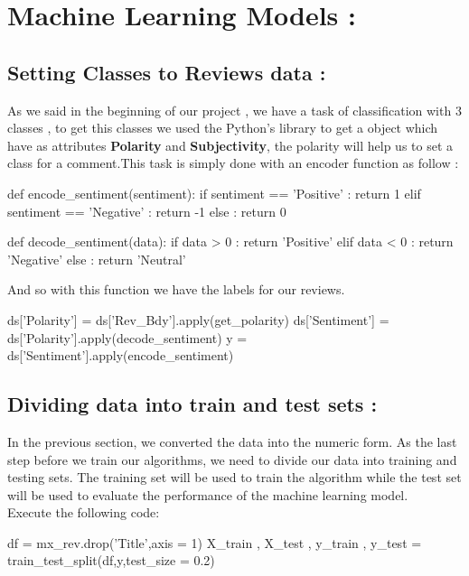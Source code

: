 \documentclass{article}
\begin{document}
\section{ Machine Learning Models :  }
\subsection{Setting Classes to Reviews data : }
As we said in the beginning of our project , we have a task of classification with 3 classes , to get this classes we used the  Python's library to get a  object which have as attributes \textbf{Polarity} and \textbf{Subjectivity}, the polarity will help us to set a class for a comment.This task is simply done with an encoder function as follow :
\begin{code}
def encode_sentiment(sentiment):
    if sentiment == 'Positive' :
      return 1
    elif sentiment == 'Negative' :
      return -1
    else :
      return 0

def decode_sentiment(data):
    if data > 0 :
      return 'Positive'
    elif data < 0 :
      return 'Negative'
    else :
      return 'Neutral'
\end{code}
\noindent
And so with this function we have the labels for our reviews.
\begin{code}
ds['Polarity'] = ds['Rev_Bdy'].apply(get_polarity)
ds['Sentiment'] = ds['Polarity'].apply(decode_sentiment)
y = ds['Sentiment'].apply(encode_sentiment)
\end{code}

\subsection{Dividing data into train and test sets : }
In the previous section, we converted the data into the numeric form. As the last step before we train our algorithms, we need to divide our data into training and testing sets. The training set will be used to train the algorithm while the test set will be used to evaluate the performance of the machine learning model.\\
Execute the following code:
\begin{code}
df = mx_rev.drop('Title',axis = 1)
X_train , X_test , y_train , y_test = train_test_split(df,y,test_size = 0.2)
\end{code}
\end{document}
